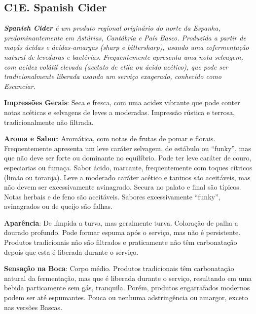 \subsection*{C1E. Spanish Cider}

\textit{\textbf{Spanish Cider} é um produto regional originário do norte da Espanha, predominantemente em Astúrias, Cantábria e País Basco. Produzida a partir de maçãs ácidas e ácidas-amargas (\textit{sharp} e \textit{bittersharp}), usando uma cofermentação natural de leveduras e bactérias. Frequentemente apresenta uma nota selvagem, com acidez volátil elevada (acetato de etila ou ácido acético), que pode ser tradicionalmente liberada usando um serviço exagerado, conhecido como \textit{Escanciar}.}

\textbf{Impressões Gerais}: Seca e fresca, com uma acidez vibrante que pode conter notas acéticas e selvagens de leves a moderadas. Impressão rústica e terrosa, tradicionalmente não filtrada.

\textbf{Aroma e Sabor}: Aromática, com notas de frutas de pomar e florais. Frequentemente apresenta um leve caráter selvagem, de estábulo ou “funky”, mas que não deve ser forte ou dominante no equilíbrio. Pode ter leve caráter de couro, especiarias ou fumaça. Sabor ácido, marcante, frequentemente com toques cítricos (limão ou toranja). Leve a moderado caráter acético e taninos são aceitáveis, mas não devem ser excessivamente avinagrado. Secura no palato e final são típicos. Notas herbais e de feno são aceitáveis. Sabores excessivamente “funky”, avinagrados ou de queijo são falhas.

\textbf{Aparência}: De límpida a turva, mas geralmente turva. Coloração de palha a dourado profundo. Pode formar espuma após o serviço, mas não é persistente. Produtos tradicionais não são filtrados e praticamente não têm carbonatação depois que esta é liberada durante o serviço.

\textbf{Sensação na Boca}: Corpo médio. Produtos tradicionais têm carbonatação natural da fermentação, mas que é liberada durante o serviço, resultando em uma bebida particamente sem gás, tranquila. Porém, produtos engarrafados modernos podem ser até espumantes. Pouca ou nenhuma adstringência ou amargor, exceto nas versões Bascas.


